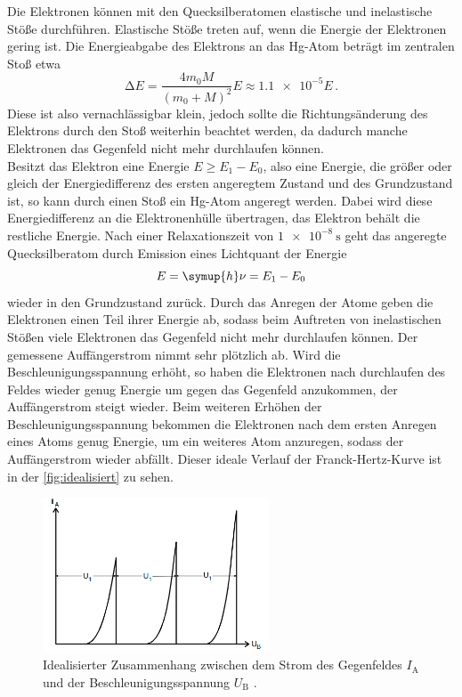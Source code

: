     \noindent Die Elektronen können mit den Quecksilberatomen elastische und inelastische Stöße durchführen. Elastische Stöße treten auf, wenn die Energie der Elektronen 
    gering ist. Die Energieabgabe des Elektrons an das Hg-Atom beträgt im zentralen Stoß etwa
    \begin{equation*}
        \increment E = \frac{4 m_0 M}{(m_0 + M)^2}E \approx \num{1.1e-5}E \, . 
    \end{equation*}
    Diese ist also vernachlässigbar klein, jedoch sollte die Richtungsänderung des Elektrons durch den Stoß weiterhin beachtet werden, da dadurch manche Elektronen das 
    Gegenfeld nicht mehr durchlaufen können. \\
    Besitzt das Elektron eine Energie $E \geq E_1 - E_0 $, also eine Energie, die größer oder gleich der Energiedifferenz des ersten angeregtem Zustand und des Grundzustand 
    ist, so kann durch einen Stoß ein Hg-Atom angeregt werden. Dabei wird diese Energiedifferenz an die Elektronenhülle übertragen, das Elektron behält die restliche
    Energie. Nach einer Relaxationszeit von $\SI{1e-8}{\second}$ geht das angeregte Quecksilberatom durch Emission eines Lichtquant der Energie 
    \begin{equation*}
        E = \symup{h} \nu = E_1 - E_0
    \end{equation*}
    wieder in den Grundzustand zurück. Durch das Anregen der Atome geben die Elektronen einen Teil ihrer Energie ab, sodass beim Auftreten von inelastischen Stößen viele Elektronen
    das Gegenfeld nicht mehr durchlaufen können. Der gemessene Auffängerstrom nimmt sehr plötzlich ab. Wird die Beschleunigungsspannung erhöht, so haben die Elektronen nach durchlaufen
    des Feldes wieder genug Energie um gegen das Gegenfeld anzukommen, der Auffängerstrom steigt wieder. Beim weiteren Erhöhen der Beschleunigungsspannung bekommen die Elektronen 
    nach dem ersten Anregen eines Atoms genug Energie, um ein weiteres Atom anzuregen, sodass der Auffängerstrom wieder abfällt. Dieser ideale Verlauf der Franck-Hertz-Kurve ist in 
    der \autoref{fig:idealisiert} zu sehen. 

    \begin{figure}[H]
        \centering 
        \includegraphics[width=0.6\textwidth]{bilder/idealer_Ub_Ia.png}
        \caption{Idealisierter Zusammenhang zwischen dem Strom des Gegenfeldes $I_{\text{A}}$ und der Beschleunigungsspannung $U_{\text{B}}$ \cite{anleitung}. }
        \label{fig:idealisiert}
    \end{figure}

